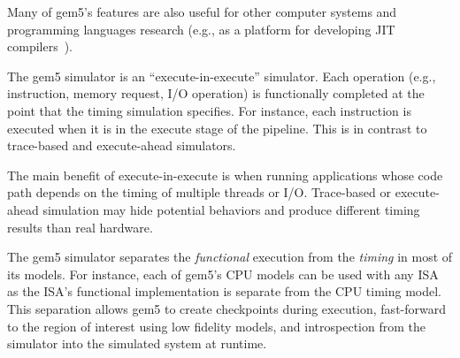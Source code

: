 Many of gem5's features are also useful for other computer systems and programming languages research (e.g., as a platform for developing JIT compilers~\cite{Shingarov2015-jit}).

The gem5 simulator is an ``execute-in-execute'' simulator.
Each operation (e.g., instruction, memory request, I/O operation) is functionally completed at the point that the timing simulation specifies.
For instance, each instruction is executed when it is in the execute stage of the pipeline.
This is in contrast to trace-based and execute-ahead simulators.

The main benefit of execute-in-execute is when running applications whose code path depends on the timing of multiple threads or I/O.
Trace-based or execute-ahead simulation may hide potential behaviors and produce different timing results than real hardware.

The gem5 simulator separates the \emph{functional} execution from the \emph{timing} in most of its models.
For instance, each of gem5's CPU models can be used with any ISA as the ISA's functional implementation is separate from the CPU timing model.
This separation allows gem5 to create checkpoints during execution, fast-forward to the region of interest using low fidelity models, and introspection from the simulator into the simulated system at runtime.

